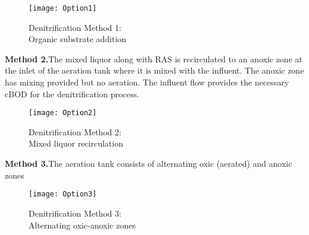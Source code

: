 	\begin{figure}[h]			
				\begin{center}
					\texttt{[image: Option1]}
					\caption{Denitrification Method 1:\\Organic substrate addition}
				\end{center}
	\end{figure}	
\noindent \textbf{Method 2.}The mixed liquor along with RAS is recirculated to an anoxic zone at the inlet of the aeration tank where it is mixed with the influent.  The anoxic zone has mixing provided but no aeration.  The influent flow provides the necessary cBOD for the denitrification process.\\

			\begin{figure}[h]	
				\begin{center}
					\texttt{[image: Option2]}
					\caption{Denitrification Method 2:\\Mixed liquor recirculation}
				\end{center}
					\end{figure}
					\newpage
\noindent \textbf{Method 3.}The aeration tank consists of alternating oxic (aerated) and anoxic zones
				
			\begin{figure}[h]		
				\begin{center}
					\texttt{[image: Option3]}
			\caption{Denitrification Method 3:\\Alternating oxic-anoxic zones}
				\end{center}
				\end{figure}

